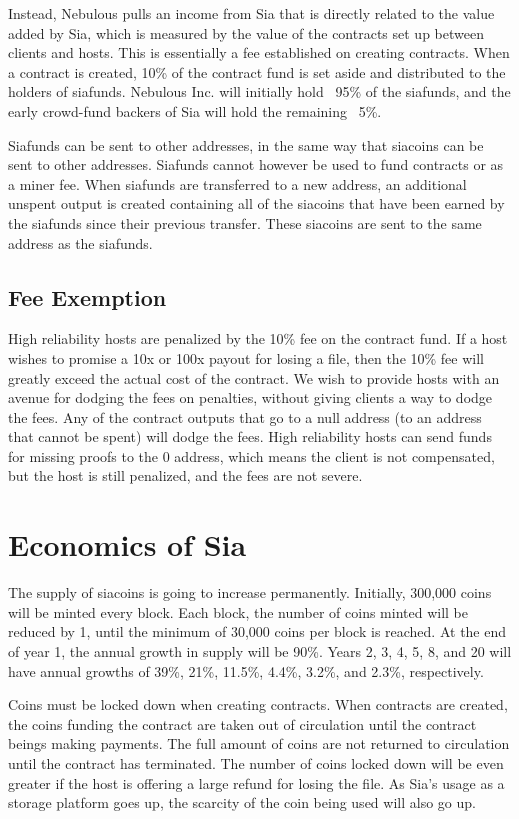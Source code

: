 \documentclass[twocolumn]{article}
\begin{document}
Instead, Nebulous pulls an income from Sia that is directly related to the value added by Sia, which is measured by the value of the contracts set up between clients and hosts.
This is essentially a fee established on creating contracts.
When a contract is created, 10\% of the contract fund is set aside and distributed to the holders of siafunds.
Nebulous Inc. will initially hold ~95\% of the siafunds, and the early crowd-fund backers of Sia will hold the remaining ~5\%.

Siafunds can be sent to other addresses, in the same way that siacoins can be sent to other addresses.
Siafunds cannot however be used to fund contracts or as a miner fee.
When siafunds are transferred to a new address, an additional unspent output is created containing all of the siacoins that have been earned by the siafunds since their previous transfer.
These siacoins are sent to the same address as the siafunds.

\subsection{Fee Exemption}
High reliability hosts are penalized by the 10\% fee on the contract fund.
If a host wishes to promise a 10x or 100x payout for losing a file, then the 10\% fee will greatly exceed the actual cost of the contract.
We wish to provide hosts with an avenue for dodging the fees on penalties, without giving clients a way to dodge the fees.
Any of the contract outputs that go to a null address (to an address that cannot be spent) will dodge the fees.
High reliability hosts can send funds for missing proofs to the 0 address, which means the client is not compensated, but the host is still penalized, and the fees are not severe.

\section{Economics of Sia}
The supply of siacoins is going to increase permanently.
Initially, 300,000 coins will be minted every block.
Each block, the number of coins minted will be reduced by 1, until the minimum of 30,000 coins per block is reached.
At the end of year 1, the annual growth in supply will be 90\%.
Years 2, 3, 4, 5, 8, and 20 will have annual growths of 39\%, 21\%, 11.5\%, 4.4\%, 3.2\%, and 2.3\%, respectively.

Coins must be locked down when creating contracts.
When contracts are created, the coins funding the contract are taken out of circulation until the contract beings making payments.
The full amount of coins are not returned to circulation until the contract has terminated.
The number of coins locked down will be even greater if the host is offering a large refund for losing the file.
As Sia's usage as a storage platform goes up, the scarcity of the coin being used will also go up.
\end{document}
